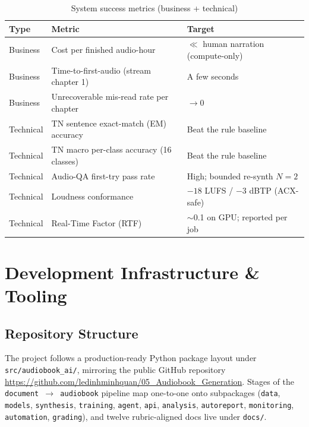 \documentclass[12pt,a4paper]{article}
\begin{document}
\begin{table}[H]
\centering
\caption{System success metrics (business + technical)}
\begin{tabularx}{\linewidth}{@{} l L l @{}}
\toprule
\textbf{Type} & \textbf{Metric} & \textbf{Target} \\
\midrule
Business & Cost per finished audio-hour & $\ll$ human narration (compute-only) \\
Business & Time-to-first-audio (stream chapter 1) & A few seconds \\
Business & Unrecoverable mis-read rate per chapter & $\rightarrow 0$ \\
Technical & TN sentence exact-match (EM) accuracy & Beat the rule baseline \\
Technical & TN macro per-class accuracy (16 classes) & Beat the rule baseline \\
Technical & Audio-QA first-try pass rate & High; bounded re-synth $N=2$ \\
Technical & Loudness conformance & $-18$ LUFS / $-3$ dBTP (ACX-safe) \\
Technical & Real-Time Factor (RTF) & $\sim$0.1 on GPU; reported per job \\
\bottomrule
\end{tabularx}
\end{table}

\section{Development Infrastructure \& Tooling}

\subsection{Repository Structure}

The project follows a production-ready Python package layout under \texttt{src/audiobook\_ai/}, mirroring the public GitHub repository \url{https://github.com/ledinhminhquan/05_Audiobook_Generation}. Stages of the \texttt{document $\rightarrow$ audiobook} pipeline map one-to-one onto subpackages (\texttt{data}, \texttt{models}, \texttt{synthesis}, \texttt{training}, \texttt{agent}, \texttt{api}, \texttt{analysis}, \texttt{autoreport}, \texttt{monitoring}, \texttt{automation}, \texttt{grading}), and twelve rubric-aligned docs live under \texttt{docs/}.
\end{document}
